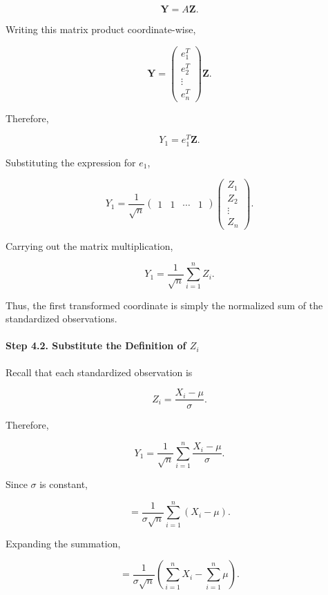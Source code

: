 \documentclass[11pt]{article}
\begin{document}
\begin{mdframed}[
		linewidth=0.8pt,
		roundcorner=6pt,
		backgroundcolor=gray!5,
		linecolor=gray!60,
		innertopmargin=10pt,
		innerbottommargin=10pt,
		innerleftmargin=10pt,
		innerrightmargin=10pt
		]
		\[
		\mathbf Y=A\mathbf Z.
		\]
		
		Writing this matrix product coordinate-wise,
		
		\[
		\mathbf Y
		=
		\begin{pmatrix}
			e_1^T\\
			e_2^T\\
			\vdots\\
			e_n^T
		\end{pmatrix}
		\mathbf Z.
		\]
		
		Therefore,
		
		\[
		Y_1
		=
		e_1^T\mathbf Z.
		\]
		
		Substituting the expression for $e_1$,
		
		\[
		Y_1
		=
		\frac1{\sqrt n}
		\begin{pmatrix}
			1&1&\cdots&1
		\end{pmatrix}
		\begin{pmatrix}
			Z_1\\
			Z_2\\
			\vdots\\
			Z_n
		\end{pmatrix}.
		\]
		
		Carrying out the matrix multiplication,
		
		\[
		\boxed{
			Y_1
			=
			\frac1{\sqrt n}
			\sum_{i=1}^{n}Z_i.
		}
		\]
		
		Thus, the first transformed coordinate is simply the normalized sum of the
		standardized observations.
		
		\vspace{0.3cm}
		
		\paragraph{Step 4.2. Substitute the Definition of $Z_i$}
		
		Recall that each standardized observation is
		
		\[
		Z_i
		=
		\frac{X_i-\mu}{\sigma}.
		\]
		
		Therefore,
		
		\[
		Y_1
		=
		\frac1{\sqrt n}
		\sum_{i=1}^{n}
		\frac{X_i-\mu}{\sigma}.
		\]
		
		Since $\sigma$ is constant,
		
		\[
		=
		\frac1{\sigma\sqrt n}
		\sum_{i=1}^{n}(X_i-\mu).
		\]
		
		Expanding the summation,
		
		\[
		=
		\frac1{\sigma\sqrt n}
		\left(
		\sum_{i=1}^{n}X_i
		-
		\sum_{i=1}^{n}\mu
		\right).
		\]
		

\end{mdframed}
\end{document}
